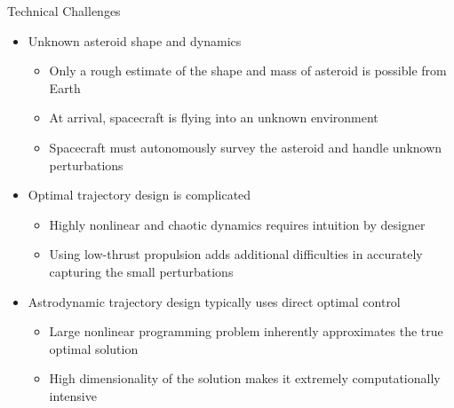 \documentclass[final, usenames, dvipsnames]{beamer}
\newlength{\onecolwidth}
\begin{document}
\begin{frame}[t]
\begin{columns}[T,onlytextwidth]
\begin{column}{\onecolwidth}
        \begin{block}{Technical Challenges}
            \begin{itemize}
                \item Unknown asteroid shape and dynamics
                    \begin{itemize}
                        \item Only a rough estimate of the shape and mass of asteroid is possible from Earth
                        \item At arrival, spacecraft is flying into an unknown environment 
                        \item Spacecraft must autonomously survey the asteroid and handle unknown perturbations
                    \end{itemize}
                \item Optimal trajectory design is complicated
                    \begin{itemize}
                        \item Highly nonlinear and chaotic dynamics requires intuition by designer
                        \item Using low-thrust propulsion adds additional difficulties in accurately capturing the small perturbations
                    \end{itemize}
                \item Astrodynamic trajectory design typically uses direct optimal control
                    \begin{itemize}
                        \item Large nonlinear programming problem inherently approximates the true optimal solution
                        \item High dimensionality of the solution makes it extremely computationally intensive
                    \end{itemize}
            \end{itemize}
        \end{block} 


\end{column}
\end{columns}
\end{frame}
\end{document}
